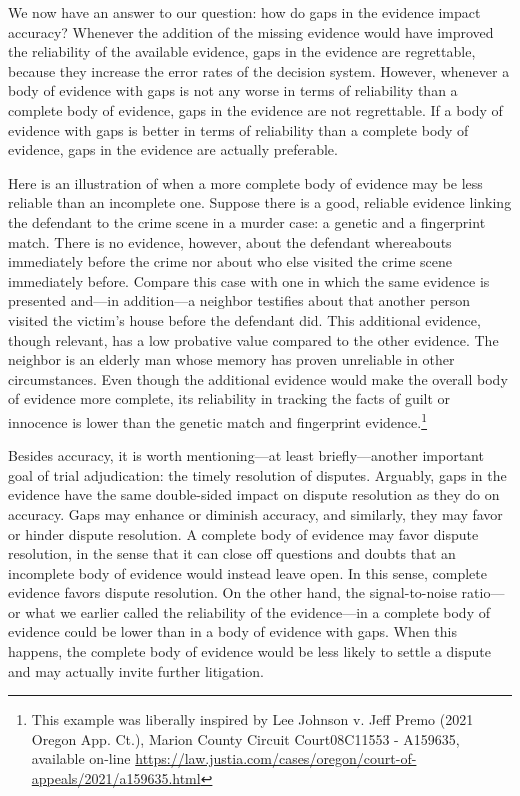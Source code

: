 \documentclass[
  10pt,
  dvipsnames,enabledeprecatedfontcommands]{scrartcl}
\begin{document}
We now have an answer to our question: how do gaps in the evidence
impact accuracy? Whenever the addition of the missing evidence would
have improved the reliability of the available evidence, gaps in the
evidence are regrettable, because they increase the error rates of the
decision system. However, whenever a body of evidence with gaps is not
any worse in terms of reliability than a complete body of evidence, gaps
in the evidence are not regrettable. If a body of evidence with gaps is
better in terms of reliability than a complete body of evidence, gaps in
the evidence are actually preferable.

Here is an illustration of when a more complete body of evidence may be
less reliable than an incomplete one. Suppose there is a good, reliable
evidence linking the defendant to the crime scene in a murder case: a
genetic and a fingerprint match. There is no evidence, however, about
the defendant whereabouts immediately before the crime nor about who
else visited the crime scene immediately before. Compare this case with
one in which the same evidence is presented and---in addition---a
neighbor testifies about that another person visited the victim's house
before the defendant did. This additional evidence, though relevant, has
a low probative value compared to the other evidence. The neighbor is an
elderly man whose memory has proven unreliable in other circumstances.
Even though the additional evidence would make the overall body of
evidence more complete, its reliability in tracking the facts of guilt
or innocence is lower than the genetic match and fingerprint
evidence.\footnote{This example was liberally inspired by Lee Johnson v.
  Jeff Premo (2021 Oregon App. Ct.), Marion County Circuit Court08C11553
  - A159635, available on-line
  \url{https://law.justia.com/cases/oregon/court-of-appeals/2021/a159635.html}}

Besides accuracy, it is worth mentioning---at least briefly---another
important goal of trial adjudication: the timely resolution of disputes.
Arguably, gaps in the evidence have the same double-sided impact on
dispute resolution as they do on accuracy. Gaps may enhance or diminish
accuracy, and similarly, they may favor or hinder dispute resolution. A
complete body of evidence may favor dispute resolution, in the sense
that it can close off questions and doubts that an incomplete body of
evidence would instead leave open. In this sense, complete evidence
favors dispute resolution. On the other hand, the signal-to-noise
ratio---or what we earlier called the reliability of the evidence---in a
complete body of evidence could be lower than in a body of evidence with
gaps. When this happens, the complete body of evidence would be less
likely to settle a dispute and may actually invite further litigation.
\end{document}
